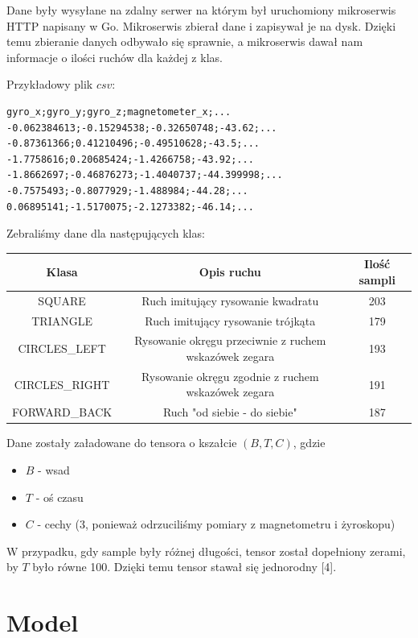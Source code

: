 \documentclass[10pt]{article}
\begin{document}
Dane były wysyłane na zdalny serwer na którym był uruchomiony mikroserwis HTTP napisany w Go. Mikroserwis zbierał dane i zapisywał je na dysk. Dzięki temu zbieranie danych odbywało się sprawnie, a mikroserwis dawał nam informacje o ilości ruchów dla każdej z klas.

Przykładowy plik $csv$:
\begin{verbatim}  
gyro_x;gyro_y;gyro_z;magnetometer_x;...
-0.062384613;-0.15294538;-0.32650748;-43.62;...
-0.87361366;0.41210496;-0.49510628;-43.5;...
-1.7758616;0.20685424;-1.4266758;-43.92;...
-1.8662697;-0.46876273;-1.4040737;-44.399998;...
-0.7575493;-0.8077929;-1.488984;-44.28;...
0.06895141;-1.5170075;-2.1273382;-46.14;...
\end{verbatim}

\pagebreak

Zebraliśmy dane dla następujących klas:

\begin{center}
\begin{tabular}{ |c|c|c| } 
  \hline
  Klasa & Opis ruchu & Ilość sampli \\ 
  \hline
  SQUARE & Ruch imitujący rysowanie kwadratu & 203 \\ 
  \hline
  TRIANGLE & Ruch imitujący rysowanie trójkąta & 179 \\ 
  \hline
  CIRCLES\_LEFT & Rysowanie okręgu przeciwnie z ruchem wskazówek zegara & 193 \\
  \hline
  CIRCLES\_RIGHT & Rysowanie okręgu zgodnie z ruchem wskazówek zegara & 191 \\
  \hline
  FORWARD\_BACK & Ruch "od siebie - do siebie" & 187 \\
  \hline
\end{tabular}
\end{center}

Dane zostały załadowane do tensora o kszałcie $(B, T, C)$, gdzie
\begin{itemize}
\item $B$ - wsad
\item $T$ - oś czasu
\item $C$ - cechy (3, ponieważ odrzuciliśmy pomiary z magnetometru i żyroskopu)
\end{itemize}  

W przypadku, gdy sample były różnej długości, tensor został dopełniony zerami, by $T$ było równe 100. Dzięki temu tensor stawał się jednorodny [4]. 

\section{Model}
\end{document}
